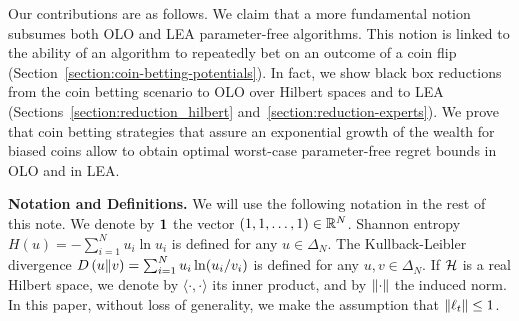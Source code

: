 Our contributions are as follows. We claim that a more fundamental notion
subsumes both \ac{OLO} and \ac{LEA} parameter-free algorithms. This notion is linked to the ability of an
algorithm to repeatedly bet on an outcome of a coin flip
(Section~\ref{section:coin-betting-potentials}). In fact, we show black box
reductions from the coin betting scenario to \ac{OLO} over Hilbert spaces and to
\ac{LEA}
(Sections~\ref{section:reduction_hilbert} and~\ref{section:reduction-experts}).
We prove that coin betting strategies that assure an exponential growth of the
wealth for biased coins allow to obtain optimal worst-case parameter-free regret bounds in \ac{OLO}
and in \ac{LEA}.


\noindent\textbf{Notation and Definitions.}
We will use the following notation in the rest of this note. We denote by
$\mathbf{1}$ the vector $(1,1,\dots,1) \in \mathbb{R}^N$. Shannon entropy $H(u) =
-\sum_{i=1}^N u_i \ln u_i$ is defined for any $u \in \Delta_N$.  The
Kullback-Leibler divergence $D\left({u}\middle\|{v}\right) = \sum_{i=1}^N u_i \ln(u_i/v_i)$ is
defined for any $u,v \in \Delta_N$. If $\mathcal{H}$ is a real Hilbert space, we denote
by $\langle \cdot, \cdot \rangle$ its inner product, and by $\left\|{\cdot}\right\|$ the
induced norm. In this paper, without loss of generality, we make the assumption that $\left\|{\ell_t}\right\| \le 1$.

